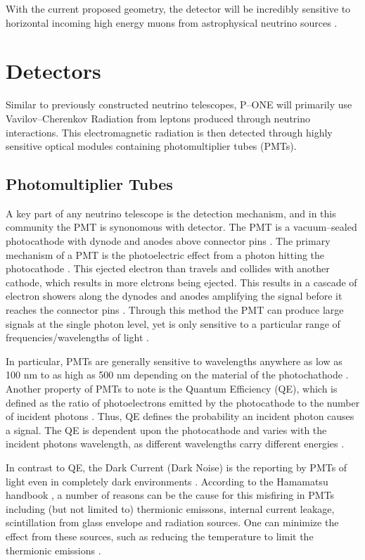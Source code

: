 With the current proposed geometry, the detector will be incredibly sensitive to horizontal incoming high energy muons from astrophysical neutrino sources \cite{pone}. 

\section{Detectors}
Similar to previously constructed neutrino telescopes, P--ONE will primarily use Vavilov--Cherenkov Radiation from leptons produced through neutrino interactions. This electromagnetic radiation is then detected through highly sensitive optical modules containing photomultiplier tubes (PMTs).

\subsection{Photomultiplier Tubes}

A key part of any neutrino telescope is the detection mechanism, and in this community the PMT is synonomous with detector. The PMT is a vacuum--sealed photocathode with dynode and anodes above connector pins \cite{ham}. The primary mechanism of a PMT is the photoelectric effect from a photon hitting the photocathode \cite{pmt_hist}. This ejected electron than travels and collides with another cathode, which results in more elctrons being ejected. This results in a cascade of electron showers along the dynodes and anodes amplifying the signal before it reaches the connector pins \cite{pmt_hist}. Through this method the PMT can produce large signals at the single photon level, yet is only sensitive to a particular range of frequencies/wavelengths of light \cite{pmt_hist}.

In particular, PMTs are generally sensitive to wavelengths anywhere as low as 100 nm to as high as 500 nm depending on the material of the photochathode \cite{ham}. Another property of PMTs to note is the Quantum Efficiency (QE), which is defined as the ratio of photoelectrons emitted by the photocathode to the number of incident photons \cite{ham}. Thus, QE defines the probability an incident photon causes a signal. The QE is dependent upon the photocathode and varies with the incident photons wavelength, as different wavelengths carry different energies \cite{ham}.

In contrast to QE, the Dark Current (Dark Noise) is the reporting by PMTs of light even in completely dark environments \cite{ham}. According to the Hamamatsu handbook \cite{ham}, a number of reasons can be the cause for this misfiring in PMTs including (but not limited to) thermionic emissons, internal current leakage, scintillation from glass envelope and radiation sources. One can minimize the effect from these sources, such as reducing the temperature to limit the thermionic emissions \cite{ham}.

